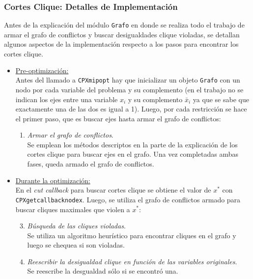 \subsubsection{Cortes Clique: Detalles de Implementación}

Antes de la explicación del módulo \verb_Grafo_ en donde se realiza todo el trabajo de armar el grafo de conflictos y buscar desigualdades clique violadas, se detallan algunos aspectos de la implementaci\'on respecto a los pasos para encontrar los cortes clique.

\begin{itemize}
\item \underline{Pre-optimización:}\\
Antes del llamado a \verb_CPXmipopt_ hay que inicializar un objeto \verb_Grafo_  con un nodo por cada variable del problema y su complemento (en el trabajo no se indican los ejes entre una variable $x_i$ y su complemento $\bar{x}_i$ ya que se sabe que exactamente una de las dos es igual a 1). Luego, por cada restricción se hace el primer paso, que es buscar ejes hasta armar el grafo de conflictos:
	\begin{enumerate}[1{)}]
	\item \emph{Armar el grafo de conflictos}.\\
		Se emplean los m\'etodos descriptos en la parte de la explicaci\'on de los cortes clique para buscar ejes en el grafo. Una vez completadas ambas fases, queda armado el grafo de conflictos.
	\end{enumerate}

\item \underline{Durante la optimización:}\\
En el \emph{cut callback} para buscar cortes clique se obtiene el valor de $x^*$ con \verb_CPXgetcallbacknodex_. Luego, se utiliza el grafo de conflictos armado para buscar cliques maximales que violen a $x^*$:
	\begin{enumerate}[1{)}]
	\setcounter{enumi}{2}
	\item \emph{Búsqueda de las cliques violadas}.\\
		Se utiliza un algoritmo heur\'istico para encontrar cliques en el grafo y luego se chequea si son violadas.
	\item \emph{Reescribir la desigualdad clique en función de las variables originales}.\\
		Se reescribe la desgualdad sólo si se encontró una.
	\end{enumerate}
\end{itemize}

